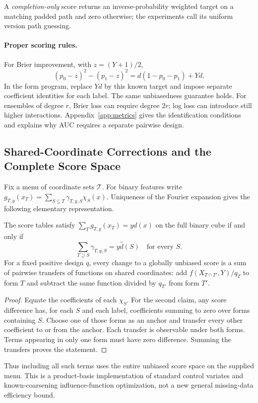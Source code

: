 A \emph{completion-only} score returns an inverse-probability weighted target on a matching padded path and zero otherwise; the experiments call its uniform version path guessing.

\paragraph{Proper scoring rules.}
For Brier improvement, with $z=(Y+1)/2$,
\[
 (p_0-z)^2-(p_1-z)^2=d(1-p_0-p_1)+Yd.
\]
In the form program, replace $Yd$ by this known target and impose separate coefficient identities for each label. The same unbiasedness guarantee holds. For ensembles of degree $r$, Brier loss can require degree $2r$; log loss can introduce still higher interactions. Appendix~\ref{app:metrics} gives the identification conditions and explains why AUC requires a separate pairwise design.


\subsection{Shared-Coordinate Corrections and the Complete Score Space}\label{app:fullscores}
Fix a menu of coordinate sets $\mathcal T$. For binary features write
$g_{T,y}(x_T)=\sum_{S\subseteq T}\gamma_{T,y,S}\chi_S(x)$.
Uniqueness of the Fourier expansion gives the following elementary
representation.

\begin{proposition}\label{prop:sharing}
The score tables satisfy $\sum_Tg_{T,y}(x_T)=yd(x)$ on the full binary cube
if and only if
\[
       \sum_{T\supseteq S}\gamma_{T,y,S}=y\widehat d(S)
       \quad\text{for every }S.
\]
For a fixed positive design $q$, every change to a globally unbiased score
is a sum of pairwise transfers of functions on shared coordinates:
add $f(X_{T\cap T'},Y)/q_T$ to form $T$ and subtract the same function
divided by $q_{T'}$ from form $T'$.
\end{proposition}
\begin{proof}
Equate the coefficients of each $\chi_S$. For the second claim, any score
difference has, for each $S$ and each label, coefficients summing to zero
over forms containing $S$. Choose one of those forms as an anchor and
transfer every other coefficient to or from the anchor. Each transfer is
observable under both forms. Terms appearing in only one form must have
zero difference. Summing the transfers proves the statement.
\end{proof}
Thus including all such terms uses the entire unbiased score space on the
supplied menu. This is a product-basis implementation of standard control
variates and known-coarsening influence-function optimization, not a new
general missing-data efficiency bound.

